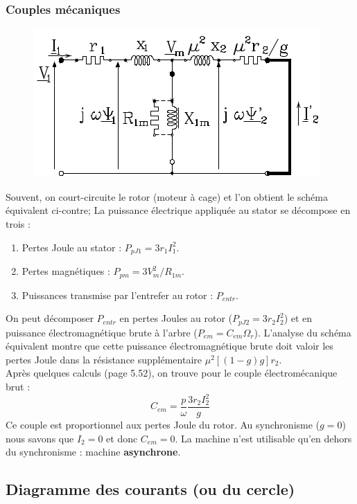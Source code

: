 		\subsubsection{Couples mécaniques}
		\begin{figure}
		\vspace{-8mm}
		\includegraphics[scale=0.45]{ch5/image26.png}
		\end{figure}
		Souvent, on court-circuite le rotor (moteur à cage) et l'on obtient le schéma 
		équivalent ci-contre; La puissance électrique appliquée au stator se décompose 
		en trois :
		\begin{enumerate}
		\item Pertes Joule au stator : $P_{pJ1} = 3r_1I_1^2$.
		\item Pertes magnétiques : $P_{pm} = 3V_m^2/R_{1m}$.
		\item Puissances transmise par l'entrefer au rotor : $P_{entr}$.
		\end{enumerate}
		On peut décomposer $P_{entr}$ en pertes Joules au rotor ($P_{pJ2} = 3r_2I_2^2$) 
		et en puissance électromagnétique brute à l'arbre ($P_{em} = C_{em}\Omega_r$). 
		L'analyse du schéma équivalent montre que cette puissance électromagnétique brute 
		doit valoir les pertes Joule dans la résistance supplémentaire $\mu^2[(1-g)g]r_2$.\\
		
		Après quelques calculs (page 5.52), on trouve pour le couple électromécanique brut :
		\begin{equation}
		C_{em} = \dfrac{p}{\omega}\dfrac{3r_2I_2^2}{g}
		\end{equation}
		Ce couple est proportionnel aux pertes Joule du rotor. Au synchronisme ($g=0$) 
		nous savons que $I_2=0$ et donc $C_{em}=0$. La machine n'est utilisable qu'en 
		dehors du synchronisme : machine \textbf{asynchrone}.



	\subsection{Diagramme des courants (ou du cercle)}

